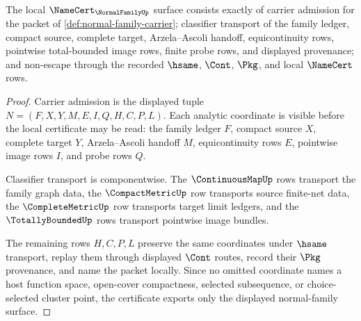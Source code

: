 \begin{theorem}
\label{thm:normal-family-namecert-obligations}
The local $\NameCert_{\NormalFamilyUp}$ surface consists exactly of carrier admission for the packet of \autoref{def:normal-family-carrier}; classifier transport of the family ledger, compact source, complete target, Arzela--Ascoli handoff, equicontinuity rows, pointwise total-bounded image rows, finite probe rows, and displayed provenance; and non-escape through the recorded $\hsame$, $\Cont$, $\Pkg$, and local $\NameCert$ rows.
\end{theorem}
\begin{proof}
Carrier admission is the displayed tuple $N=(F,X,Y,M,E,I,Q,H,C,P,L)$. Each analytic coordinate is visible before the local certificate may be read: the family ledger $F$, compact source $X$, complete target $Y$, Arzela--Ascoli handoff $M$, equicontinuity rows $E$, pointwise image rows $I$, and probe rows $Q$.

Classifier transport is componentwise. The $\ContinuousMapUp$ rows transport the family graph data, the $\CompactMetricUp$ row transports source finite-net data, the $\CompleteMetricUp$ row transports target limit ledgers, and the $\TotallyBoundedUp$ rows transport pointwise image bundles.

The remaining rows $H,C,P,L$ preserve the same coordinates under $\hsame$ transport, replay them through displayed $\Cont$ routes, record their $\Pkg$ provenance, and name the packet locally. Since no omitted coordinate names a host function space, open-cover compactness, selected subsequence, or choice-selected cluster point, the certificate exports only the displayed normal-family surface.
\end{proof}

